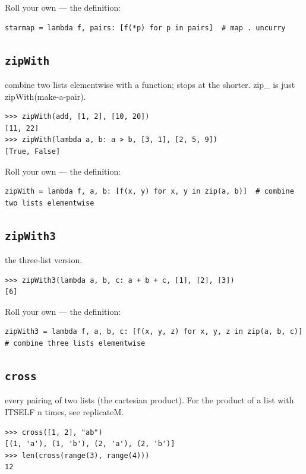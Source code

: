 \documentclass[10pt,letterpaper]{book}
\begin{document}
Roll your own --- the definition:

\begin{lstlisting}[style=ex]
starmap = lambda f, pairs: [f(*p) for p in pairs]  # map . uncurry
\end{lstlisting}

\subsection{\texttt{zipWith}}\label{def:zipWith}
combine two lists elementwise with a function; stops at the shorter. zip\_ is just zipWith(make-a-pair).
\begin{lstlisting}[style=ex]
>>> zipWith(add, [1, 2], [10, 20])
[11, 22]
>>> zipWith(lambda a, b: a > b, [3, 1], [2, 5, 9])
[True, False]
\end{lstlisting}

Roll your own --- the definition:

\begin{lstlisting}[style=ex]
zipWith = lambda f, a, b: [f(x, y) for x, y in zip(a, b)]  # combine two lists elementwise
\end{lstlisting}
\subsection{\texttt{zipWith3}}\label{def:zipWith3}
the three-list version.
\begin{lstlisting}[style=ex]
>>> zipWith3(lambda a, b, c: a + b + c, [1], [2], [3])
[6]
\end{lstlisting}

Roll your own --- the definition:

\begin{lstlisting}[style=ex]
zipWith3 = lambda f, a, b, c: [f(x, y, z) for x, y, z in zip(a, b, c)]  # combine three lists elementwise
\end{lstlisting}
\subsection{\texttt{cross}}\label{def:cross}
every pairing of two lists (the cartesian product). For the product of a list with ITSELF n times, see replicateM.
\begin{lstlisting}[style=ex]
>>> cross([1, 2], "ab")
[(1, 'a'), (1, 'b'), (2, 'a'), (2, 'b')]
>>> len(cross(range(3), range(4)))
12
\end{lstlisting}
\end{document}
